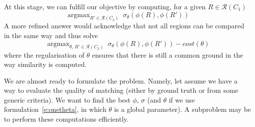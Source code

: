 \documentclass[a4paper,11pt,draft]{scrartcl}
\DeclareMathOperator*{\argmax}{argmax}
\begin{document}
At this stage, we can fulfill our objective by computing, for a given $R \in
\mathcal{R}(C_1)$
\begin{equation}
    \argmax_{R' \in \mathcal{R}(C_2)}\; \sigma_{\theta}
    \left(\phi(R), \phi(R')\right)
    \label{e:onetheta}
\end{equation}
A more refined answer would acknowledge that not all regions can be compared in
the same way and thus solve
\begin{equation}
    \argmax_{\theta ,\, R' \in \mathcal{R}(C_2)}\; \sigma_{\theta}
    \left(\phi(R), \phi(R')\right) - cost(\theta)
    \label{e:manythetas}
\end{equation}
where the regularisation of $\theta$ ensures that there is still a common
ground in the way similarity is computed.

\bigskip

We are almost ready to formulate the problem. Namely, let assume we have a way
to evaluate the quality of matching (either by ground truth or from some
generic criteria). We want to find the best $\phi$, $\sigma$ (and $\theta$ if
we use formulation~\eqref{e:onetheta}, in which $\theta$ is a global
parameter). A subproblem may be to perform these computations efficiently.
\end{document}
